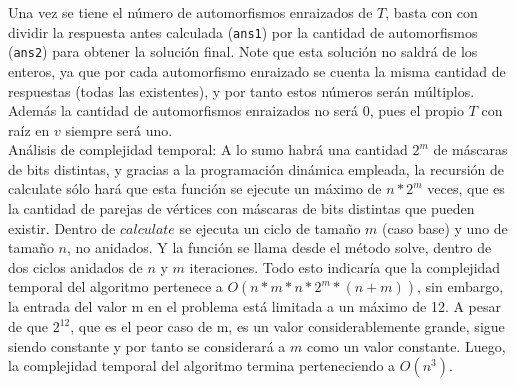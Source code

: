 \documentclass[a4paper,12pt,twocolumn]{article}
\begin{document}
		Una vez se tiene el número de automorfismos enraizados de $T$, basta con con dividir la respuesta antes calculada (\texttt{\ttfamily ans1}) por la cantidad de automorfismos (\texttt{\ttfamily ans2}) para obtener la solución final. Note que esta solución no saldrá de los enteros, ya que por cada automorfismo enraizado se cuenta la misma cantidad de respuestas (todas las existentes), y por tanto estos números serán múltiplos. Además la cantidad de automorfismos enraizados no será 0, pues el propio $T$ con raíz en $v$ siempre será uno.\\
		
		Análisis de complejidad temporal:
		A lo sumo habrá una cantidad $2^m$ de máscaras de bits distintas, y gracias a la programación dinámica empleada, la recursión de calculate sólo hará que esta función se ejecute un máximo de $n * 2^m$ veces, que es la cantidad de parejas de vértices con máscaras de bits distintas que pueden existir. Dentro de $calculate$ se ejecuta un ciclo de tamaño $m$ (caso base) y uno de tamaño $n$, no anidados. Y la función se llama desde el método solve, dentro de dos ciclos anidados de $n$ y $m$ iteraciones. Todo esto indicaría que la complejidad temporal del algoritmo pertenece a $O(n * m * n*2^m * (n + m))$, sin embargo, la entrada del valor m en el problema está limitada a un máximo de 12. A pesar de que $2^12$, que es el peor caso de m, es un valor considerablemente grande, sigue siendo constante y por tanto se considerará a $m$ como un valor constante. Luego, la complejidad temporal del algoritmo termina perteneciendo a $O(n^3)$.\\
\label{end}
\end{document}
